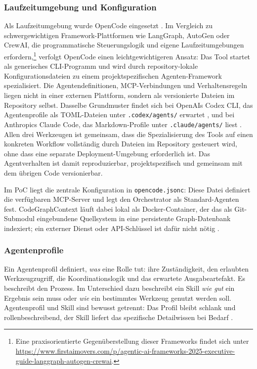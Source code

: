 \subsubsection{Laufzeitumgebung und Konfiguration}

Als Laufzeitumgebung wurde OpenCode eingesetzt \parencite{opencodetool}. Im Vergleich zu schwergewichtigen Framework-Plattformen wie LangGraph, AutoGen oder CrewAI, die programmatische Steuerungslogik und eigene Laufzeitumgebungen erfordern,\footnote{Eine praxisorientierte Gegenüberstellung dieser Frameworks findet sich unter \url{https://www.firstaimovers.com/p/agentic-ai-frameworks-2025-executive-guide-langgraph-autogen-crewai}.} verfolgt OpenCode einen leichtgewichtigeren Ansatz: Das Tool startet als generisches CLI-Programm und wird durch repository-lokale Konfigurationsdateien zu einem projektspezifischen Agenten-Framework spezialisiert. Die Agentendefinitionen, MCP-Verbindungen und Verhaltensregeln liegen nicht in einer externen Plattform, sondern als versionierte Dateien im Repository selbst. Dasselbe Grundmuster findet sich bei OpenAIs Codex CLI, das Agentenprofile als TOML-Dateien unter \texttt{.codex/agents/} erwartet \parencite{codexcli}, und bei Anthropics Claude Code, das Markdown-Profile unter \texttt{.claude/agents/} liest \parencite{claudecodedocs}. Allen drei Werkzeugen ist gemeinsam, dass die Spezialisierung des Tools auf einen konkreten Workflow vollständig durch Dateien im Repository gesteuert wird, ohne dass eine separate Deployment-Umgebung erforderlich ist. Das Agentverhalten ist damit reproduzierbar, projektspezifisch und gemeinsam mit dem übrigen Code versionierbar.

Im PoC liegt die zentrale Konfiguration in \texttt{opencode.jsonc}: Diese Datei definiert die verfügbaren MCP-Server und legt den Orchestrator als Standard-Agenten fest. CodeGraphContext läuft dabei lokal als Docker-Container, der das als Git-Submodul eingebundene Quellsystem in eine persistente Graph-Datenbank indexiert; ein externer Dienst oder API-Schlüssel ist dafür nicht nötig \parencite{codegraphcontext}.

\subsubsection{Agentenprofile}

Ein Agentenprofil definiert, \emph{was} eine Rolle tut: ihre Zuständigkeit, den erlaubten Werkzeugzugriff, die Koordinationslogik und das erwartete Ausgabeartefakt. Es beschreibt den Prozess. Im Unterschied dazu beschreibt ein Skill \emph{wie gut} ein Ergebnis sein muss oder \emph{wie} ein bestimmtes Werkzeug genutzt werden soll. Agentenprofil und Skill sind bewusst getrennt: Das Profil bleibt schlank und rollenbeschreibend, der Skill liefert das spezifische Detailwissen bei Bedarf \parencite{agentskillsspecification}.

